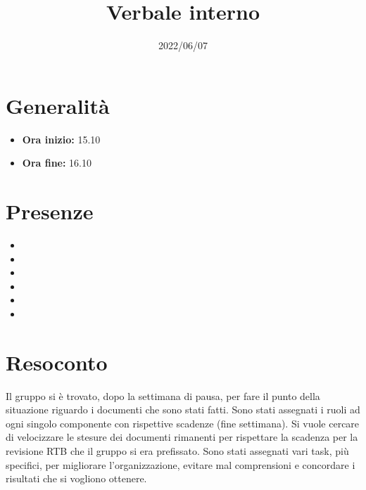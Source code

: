 \documentclass{classes/base}
\title{Verbale interno}
\date{2022/06/07}
\author{\angela}
\renewcommand{\maketitle}{
    
}
\begin{document}
    \maketitle

    \section*{Generalità}
    \begin{itemize}
        \item \textbf{Ora inizio:} 15.10
        \item \textbf{Ora fine:} 16.10
    \end{itemize}

    \section*{Presenze}
    \begin{itemize}
        \item \angela
        \item \marcob
        \item \tommaso
        \item \ruth
        \item \matteo
        \item \marcov
    \end{itemize}

    \section*{Resoconto}
    Il gruppo si è trovato, dopo la settimana di pausa, per fare il punto della situazione riguardo i documenti che sono stati fatti.
    Sono stati assegnati i ruoli ad ogni singolo componente con rispettive scadenze (fine settimana). 
    Si vuole cercare di velocizzare le stesure dei documenti rimanenti per rispettare la scadenza per la revisione RTB che il gruppo si era prefissato.
    Sono stati assegnati vari task, più specifici, per migliorare l'organizzazione, evitare mal comprensioni e concordare i risultati che si vogliono ottenere.
\end{document}
